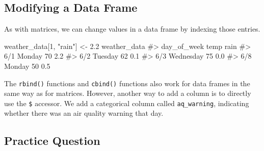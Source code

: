 \documentclass[
  letterpaper,
]{latex/krantz}
\makeatletter
\newenvironment{Shaded}{\begin{snugshade}}{\end{snugshade}}
\newcommand{\CommentTok}[1]{\textcolor[rgb]{0.37,0.37,0.37}{#1}}
\newcommand{\DecValTok}[1]{\textcolor[rgb]{0.68,0.00,0.00}{#1}}
\newcommand{\FloatTok}[1]{\textcolor[rgb]{0.68,0.00,0.00}{#1}}
\newcommand{\FunctionTok}[1]{\textcolor[rgb]{0.28,0.35,0.67}{#1}}
\newcommand{\NormalTok}[1]{\textcolor[rgb]{0.00,0.23,0.31}{#1}}
\newcommand{\OtherTok}[1]{\textcolor[rgb]{0.00,0.23,0.31}{#1}}
\newcommand{\SpecialCharTok}[1]{\textcolor[rgb]{0.37,0.37,0.37}{#1}}
\newcommand{\StringTok}[1]{\textcolor[rgb]{0.13,0.47,0.30}{#1}}
\newenvironment{kframe}{%
\medskip{}
\setlength{\fboxsep}{.8em}
 \def\at@end@of@kframe{}%
 \ifinner\ifhmode%
  \def\at@end@of@kframe{\end{minipage}}%
  \begin{minipage}{\columnwidth}%
 \fi\fi%
 \def\FrameCommand##1{\hskip\@totalleftmargin \hskip-\fboxsep
 \colorbox{shadecolor}{##1}\hskip-\fboxsep
     \hskip-\linewidth \hskip-\@totalleftmargin \hskip\columnwidth}%
 \MakeFramed {\advance\hsize-\width
   \@totalleftmargin\z@ \linewidth\hsize
   \@setminipage}}%
 {\par\unskip\endMakeFramed%
 \at@end@of@kframe}
\renewenvironment{Shaded}{\begin{kframe}}{\end{kframe}}
\makeatother
\begin{document}
\subsection{\texorpdfstring{Modifying a Data Frame
}{Modifying a Data Frame }}\label{modifying-a-data-frame}

As with matrices, we can change values in a data frame by indexing those
entries.

\begin{Shaded}
\begin{Highlighting}[]
\NormalTok{weather\_data[}\DecValTok{1}\NormalTok{, }\StringTok{"rain"}\NormalTok{] }\OtherTok{\textless{}{-}} \FloatTok{2.2}
\NormalTok{weather\_data}
\CommentTok{\#\textgreater{}     day\_of\_week temp rain}
\CommentTok{\#\textgreater{} 6/1      Monday   70  2.2}
\CommentTok{\#\textgreater{} 6/2     Tuesday   62  0.1}
\CommentTok{\#\textgreater{} 6/3   Wednesday   75  0.0}
\CommentTok{\#\textgreater{} 6/8      Monday   50  0.5}
\end{Highlighting}
\end{Shaded}

The \texttt{rbind()}
functions and
\texttt{cbind()} functions
also work for data frames in the same way as for matrices. However,
another way to add a column is to directly use the
\texttt{\$} accessor. We add a categorical column
called \texttt{aq\_warning}, indicating whether there was an air quality
warning that day.

\begin{Shaded}
\end{Shaded}

\subsection{Practice Question}\label{practice-question-2}
\end{document}
